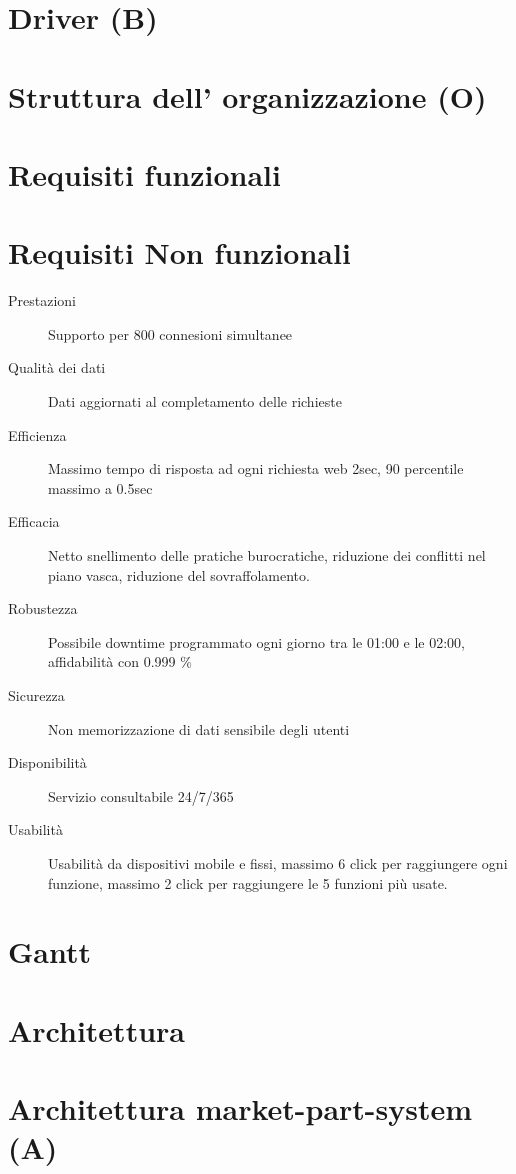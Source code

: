 \documentclass[11pt]{article} %
\begin{document}
\section{Driver (B)}

\section{Struttura dell' organizzazione (O)}

\section{Requisiti funzionali}

\section{Requisiti Non funzionali}

\begin{description}
	\item[Prestazioni] Supporto per 800 connesioni simultanee
	\item[Qualità dei dati] Dati aggiornati al completamento delle richieste
	\item[Efficienza] Massimo tempo di risposta ad ogni richiesta web 2sec, 90 percentile massimo a 0.5sec
	\item[Efficacia] Netto snellimento delle pratiche burocratiche, riduzione dei conflitti nel piano vasca, riduzione del sovraffolamento.
	\item[Robustezza] Possibile downtime programmato ogni giorno tra le 01:00 e le 02:00, affidabilità con 0.999 \%
	\item[Sicurezza] Non memorizzazione di dati sensibile degli utenti
	\item[Disponibilità] Servizio consultabile 24/7/365
	\item[Usabilità] Usabilità da dispositivi mobile e fissi, massimo 6 click per raggiungere ogni funzione, massimo 2 click per raggiungere le 5 funzioni più usate.
\end{description}


\section{Gantt}

\section{Architettura}

\section{Architettura market-part-system (A)}
\end{document}
